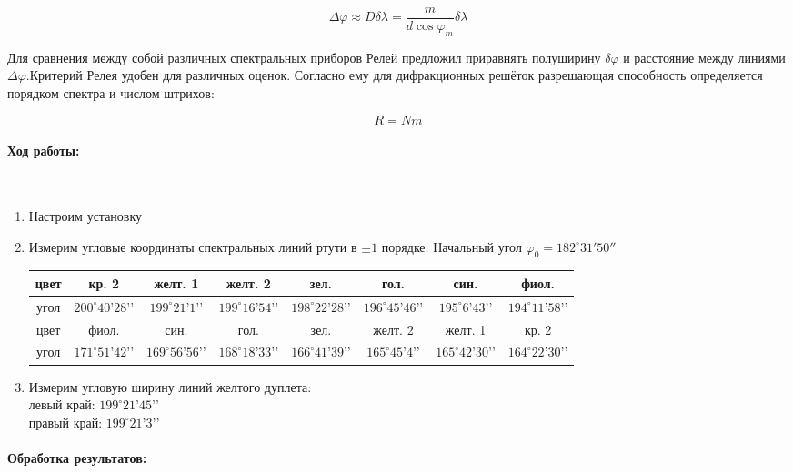 \documentclass[a4paper, 12pt]{article}
\renewcommand{\phi}{\varphi}
\newcommand{\parag}[1]{\paragraph*{#1:}}
\begin{document}
\begin{itemize}
    \begin{equation}
        \Delta \phi \approx D \delta \lambda = \dfrac{m}{d \cos \phi_m} \delta \lambda
    \end{equation}

    Для сравнения между собой различных спектральных приборов Релей предложил приравнять полуширину $\delta \phi$ и расстояние между линиями $\Delta \phi$.Критерий Релея удобен для различных оценок. Согласно ему для дифракционных решёток разрешающая способность определяется порядком спектра и числом штрихов:

    \begin{equation}
        R = N m
    \end{equation}
\end{itemize}

\parag {Ход работы} ~

\begin{enumerate}
    \item Настроим установку
    \item Измерим угловые координаты спектральных линий ртути в $\pm 1$ порядке. Начальный угол $\phi_0 = 182^\circ 31' 50''$
    
    \begin{tabular}{|c|c|c|c|c|c|c|c|} \hline
        цвет & кр. 2 & желт. 1 & желт. 2 & зел. & гол. & син. & фиол. \\ \hline
        угол & $200^\circ 40’ 28’’$ & $199^\circ 21’ 1’’$ & $199^\circ 16’ 54’’$ & $198^\circ 22’ 28’’$ & $196^\circ 45’ 46’’$ & $195^\circ 6’ 43’’$ & $194^\circ 11’ 58’’$ \\ \hline
        цвет & фиол. & син. & гол. & зел. & желт. 2 & желт. 1 & кр. 2 \\ \hline
        угол & $171^\circ 51’ 42’’$ & $169^\circ 56’ 56’’$ & $168^\circ 18’ 33’’$ & $166^\circ 41’ 39’’$ & $165^\circ 45’ 4’’$ & $165^\circ 42’ 30’’$ & $164^\circ 22’ 30’’$ \\ \hline
    \end{tabular}

    \item Измерим угловую ширину линий желтого дуплета: \\
        левый край: $199^\circ 21’ 45’’$ \\
        правый край: $199^\circ 21’ 3’’$
\end{enumerate}

\parag {Обработка результатов} ~
\end{document}

